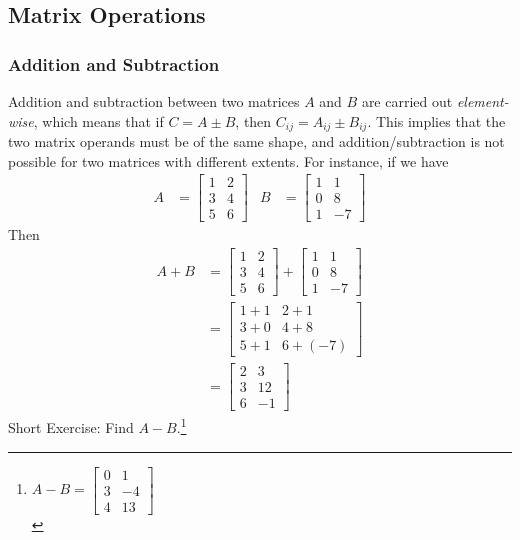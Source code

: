 \subsection{Matrix Operations} 
\subsubsection{Addition and Subtraction}
Addition and subtraction between two matrices $A$ and $B$ are carried out \textit{element-wise}, which means that if $C = A \pm B$, then $C_{ij} = A_{ij} \pm B_{ij}$. This implies that the two matrix operands must be of the same shape, and addition/subtraction is not possible for two matrices with different extents. For instance, if we have
\begin{align*}
A &=
\begin{bmatrix}
1 & 2 \\
3 & 4 \\
5 & 6
\end{bmatrix} &
B &= 
\begin{bmatrix}
1 & 1 \\
0 & 8 \\
1 & -7
\end{bmatrix}
\end{align*}
Then
\begin{align*}
A+B &= 
\begin{bmatrix}
1 & 2 \\
3 & 4 \\
5 & 6
\end{bmatrix}
+
\begin{bmatrix}
1 & 1 \\
0 & 8 \\
1 & -7
\end{bmatrix} \\
&= 
\begin{bmatrix}
1+1 & 2+1 \\
3+0 & 4+8 \\
5+1 & 6+(-7)
\end{bmatrix} \\
&= 
\begin{bmatrix}
2 & 3 \\
3 & 12 \\
6 & -1
\end{bmatrix}
\end{align*}
Short Exercise: Find $A-B$.\footnote{$A-B = \begin{bmatrix}
0 & 1 \\
3 & -4 \\
4 & 13
\end{bmatrix}$\\}

